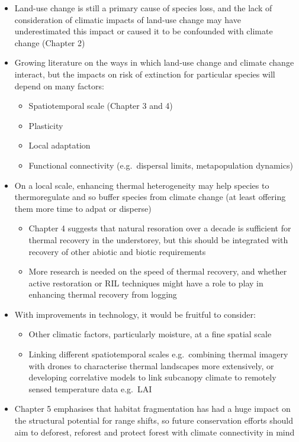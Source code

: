 \documentclass[12pt,a4paper,]{report}
\providecommand{\tightlist}{%
  \setlength{\itemsep}{0pt}\setlength{\parskip}{0pt}}
\theoremstyle{definition}
\theoremstyle{definition}
\theoremstyle{definition}
\theoremstyle{remark}
\begin{document}
\begin{itemize}
\tightlist
\item
  Land-use change is still a primary cause of species loss, and the lack
  of consideration of climatic impacts of land-use change may have
  underestimated this impact or caused it to be confounded with climate
  change (Chapter 2)
\item
  Growing literature on the ways in which land-use change and climate
  change interact, but the impacts on risk of extinction for particular
  species will depend on many factors:

  \begin{itemize}
  \tightlist
  \item
    Spatiotemporal scale (Chapter 3 and 4)
  \item
    Plasticity
  \item
    Local adaptation
  \item
    Functional connectivity (e.g.~dispersal limits, metapopulation
    dynamics)
  \end{itemize}
\item
  On a local scale, enhancing thermal heterogeneity may help species to
  thermoregulate and so buffer species from climate change (at least
  offering them more time to adpat or disperse)

  \begin{itemize}
  \tightlist
  \item
    Chapter 4 suggests that natural resoration over a decade is
    sufficient for thermal recovery in the understorey, but this should
    be integrated with recovery of other abiotic and biotic requirements
  \item
    More research is needed on the speed of thermal recovery, and
    whether active restoration or RIL techniques might have a role to
    play in enhancing thermal recovery from logging
  \end{itemize}
\item
  With improvements in technology, it would be fruitful to consider:

  \begin{itemize}
  \tightlist
  \item
    Other climatic factors, particularly moisture, at a fine spatial
    scale
  \item
    Linking different spatiotemporal scales e.g.~combining thermal
    imagery with drones to characterise thermal landscapes more
    extensively, or developing correlative models to link subcanopy
    climate to remotely sensed temperature data e.g.~LAI
  \end{itemize}
\item
  Chapter 5 emphasises that habitat fragmentation has had a huge impact
  on the structural potential for range shifts, so future conservation
  efforts should aim to deforest, reforest and protect forest with
  climate connectivity in mind


\end{itemize}
\end{document}
